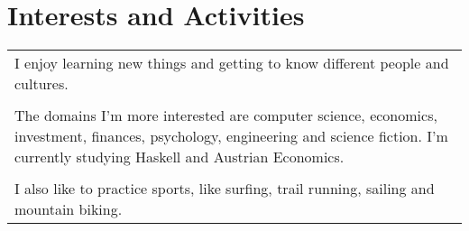 \documentclass[a4paper,10pt]{article} %
\begin{document}

\section{Interests and Activities}
\begin{tabular}{p{13cm}}
\hspace{2em} I enjoy learning new things and getting to know different
people and cultures. \\ \\

\hspace{2em} The domains I'm more interested are computer science,
economics, investment, finances, psychology, engineering and science
fiction. I'm currently studying Haskell and Austrian Economics.\\ \\

\hspace{2em} I also like to practice sports, like surfing, trail
running, sailing and mountain biking.
\end{tabular}
\end{document}
